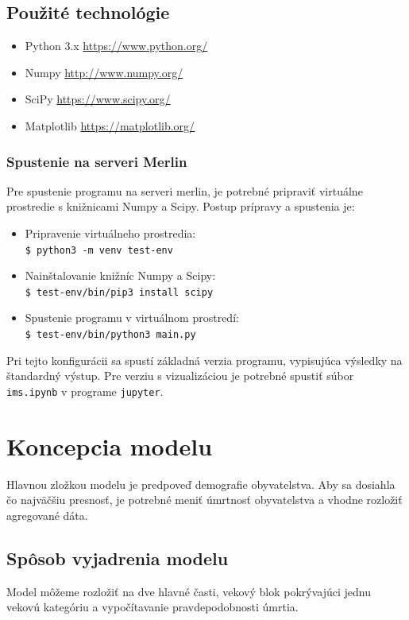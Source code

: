 \documentclass[a4paper, 11pt]{article}
\begin{document}
\subsection{Použité technológie}
\begin{itemize}
\item Python 3.x \url{https://www.python.org/}
\item Numpy \url{http://www.numpy.org/}
\item SciPy \url{https://www.scipy.org/}
\item Matplotlib \url{https://matplotlib.org/}
\end{itemize}
\subsubsection{Spustenie na serveri Merlin}
Pre spustenie programu na serveri merlin, je potrebné pripraviť virtuálne prostredie s knižnicami Numpy a Scipy. Postup prípravy a spustenia je:
\begin{itemize}
\item Pripravenie virtuálneho prostredia:\\
\texttt{\$ python3 -m venv test-env}
\item Nainštalovanie knižníc Numpy a Scipy:\\
\texttt{\$ test-env/bin/pip3 install scipy}
\item Spustenie programu v virtuálnom prostredí:\\
\texttt{\$ test-env/bin/python3 main.py}
\end{itemize}
Pri tejto konfigurácii sa spustí základná verzia programu, vypisujúca výsledky na štandardný výstup. Pre verziu s vizualizáciou je potrebné spustiť súbor \texttt{ims.ipynb} v programe \texttt{jupyter}.

\section{Koncepcia modelu}
Hlavnou zložkou modelu je predpoveď demografie obyvatelstva. Aby sa dosiahla čo najväčšiu presnosť, je potrebné meniť úmrtnosť obyvatelstva a vhodne rozložiť agregované dáta.

\subsection{Spôsob vyjadrenia modelu}
Model môžeme rozložiť na dve hlavné časti, vekový blok pokrývajúci jednu vekovú kategóriu a vypočítavanie pravdepodobnosti úmrtia.
\end{document}
